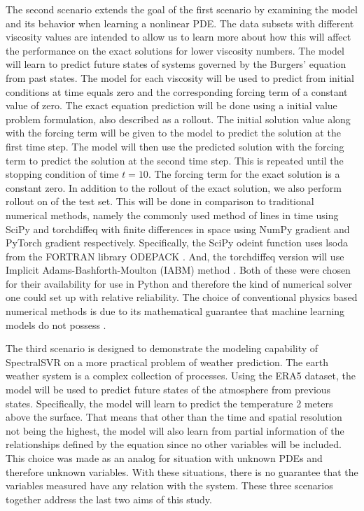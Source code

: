 The second scenario extends the goal of the first scenario by examining the model and its behavior when learning a nonlinear PDE\@. The data subsets with different viscosity values are intended to allow us to learn more about how this will affect the performance on the exact solutions for lower viscosity numbers. The model will learn to predict future states of systems governed by the Burgers' equation from past states. The model for each viscosity will be used to predict  from initial conditions at time equals zero and the corresponding forcing term of a constant value of zero. The exact equation prediction will be done using a initial value problem formulation, also described as a rollout. The initial solution value along with the forcing term will be given to the model to predict the solution at the first time step. The model will then use the predicted solution with the forcing term to predict the solution at the second time step. This is repeated until the stopping condition of time \(t=10\). The forcing term for the exact solution is a constant zero. In addition to the rollout of the exact solution, we also perform rollout on of the test set. This will be done in comparison to traditional numerical methods, namely the commonly used method of lines in time using SciPy \autocite{virtanenSciPy10Fundamental2020} and torchdiffeq \autocite{Chen_torchdiffeq_2021} with finite differences in space using NumPy gradient and PyTorch gradient respectively. Specifically, the SciPy odeint function uses lsoda from the FORTRAN library ODEPACK \autocite{osti_145724}. And, the torchdiffeq version will use Implicit Adams-Bashforth-Moulton (IABM) method \autocite{bashforth1883attempt,moulton1926new}. Both of these were chosen for their availability for use in Python and therefore the kind of numerical solver one could set up with relative reliability. The choice of conventional physics based numerical methods is due to its mathematical guarantee that machine learning models do not possess \autocite{schiesserNumericalMethodLines2012,karniadakisPhysicsinformedMachineLearning2021}.

The third scenario is designed to demonstrate the modeling capability of SpectralSVR on a more practical problem of weather prediction. The earth weather system is a complex collection of processes. Using the ERA5 dataset, the model will be used to predict future states of the atmosphere from previous states. Specifically, the model will learn to predict the temperature 2 meters above the surface. That means that other than the time and spatial resolution not being the highest, the model will also learn from partial information of the relationships defined by the equation since no other variables will be included. This choice was made as an analog for situation with unknown PDEs and therefore unknown variables. With these situations, there is no guarantee that the variables measured have any relation with the system. These three scenarios together address the last two aims of this study.

